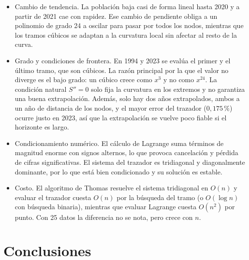 \documentclass[11pt]{article}
\begin{document}
\begin{itemize}
    \item Cambio de tendencia. La población baja casi de forma lineal hasta 2020 y
    a partir de 2021 cae con rapidez. Ese cambio de pendiente obliga a un polinomio de
    grado 24 a oscilar para pasar por todos los nodos, mientras que los tramos
    cúbicos se adaptan a la curvatura local sin afectar al resto de la curva.
    \item Grado y condiciones de frontera. En 1994 y 2023 se evalúa el primer y el
    último tramo, que son cúbicos. La razón principal por la que el valor no
    diverge es el bajo grado: un cúbico crece como $x^{3}$ y no como $x^{24}$.
    La condición natural $S''=0$ solo fija la curvatura en los extremos y no
    garantiza una buena extrapolación. Además, solo hay dos años extrapolados,
    ambos a un año de distancia de los nodos, y el mayor error del trazador
    ($0{,}175\,\%$) ocurre justo en 2023, así que la extrapolación se vuelve
    poco fiable si el horizonte es largo.
    \item Condicionamiento numérico. El cálculo de Lagrange suma términos de
    magnitud enorme con signos alternos, lo que provoca cancelación y pérdida de
    cifras significativas. El sistema del trazador es tridiagonal y diagonalmente
    dominante, por lo que está bien condicionado y su solución es estable.
    \item Costo. El algoritmo de Thomas resuelve el sistema tridiagonal en $O(n)$
    y evaluar el trazador cuesta $O(n)$ por la búsqueda del tramo (o $O(\log n)$
    con búsqueda binaria), mientras que evaluar Lagrange cuesta $O(n^2)$ por
    punto. Con 25 datos la diferencia no se nota, pero crece con $n$.
\end{itemize}

\section{Conclusiones}
\end{document}

